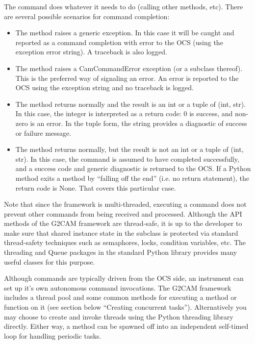 \documentclass[11pt]{report}
\begin{document}
The command does whatever it needs to do (calling other methods,
etc). There are several possible scenarios for command completion: 
\begin{itemize}
\item The method raises a generic exception. In this case it will be
caught and reported as a command completion with error to the OCS (using
the exception error string). A traceback is also logged. 

\item The method raises a CamCommandError exception (or a subclass
thereof). This is the preferred way of signaling an error. An error is
reported to the OCS using the exception string and no traceback is
logged. 

\item The method returns normally and the result is an int or a tuple of
(int, str). In this case, the integer is interpreted as a return code: 0
is success, and non-zero is an error. In the tuple form, the string
provides a diagnostic of success or failure message. 

\item The method returns normally, but the result is not an int or a
tuple of (int, str). In this case, the command is assumed to have
completed successfully, and a success code and generic diagnostic is
returned to the OCS. If a Python method exits a method by ``falling off
the end'' (i.e. no return statement), the return code is None.
That covers this particular case. 
\end{itemize}
Note that since the framework is multi-threaded, executing a command
does not prevent other commands from being received and processed.
Although the API methods of the G2CAM framework are thread-safe, it is
up to the developer to make sure that shared instance 
state in the subclass is protected via standard thread-safety techniques
such as semaphores, locks, condition variables, etc. 
The threading and Queue packages in the standard Python library provides
many useful classes for this purpose. 

Although commands are typically driven from the OCS side, an instrument
can set up it's own autonomous command invocations. 
The G2CAM framework includes a thread pool and some common methods for
executing a method or function on it (see section below ``Creating
concurrent tasks'').
Alternatively you may choose to create and invoke threads using
the Python threading library directly. Either way, a method can be
spawned off into an independent self-timed loop for handling periodic
tasks. 
\end{document}
